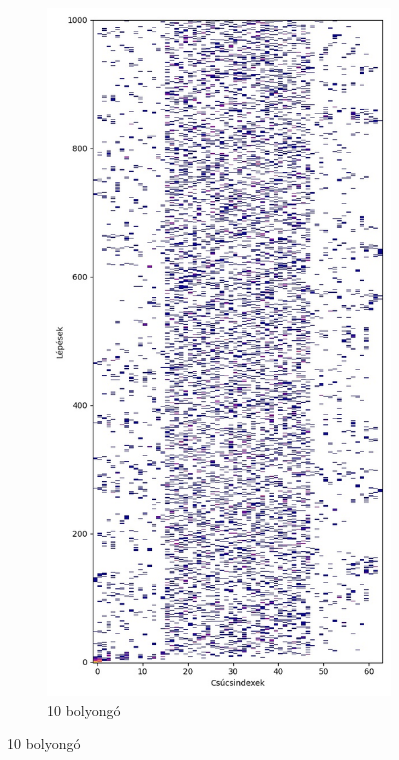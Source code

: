 \begin{figure}[H]
\begin{subfigure}{.45\linewidth}
  \end{subfigure}
  \begin{subfigure}{.45\linewidth}
    \centering
    \includegraphics[width=\linewidth]{./figures/ragasztott_binaris/sim01.jpg}
    \caption{10 bolyongó}
  \end{subfigure}
\end{figure}


